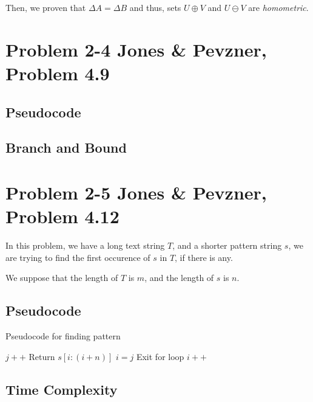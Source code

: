 \documentclass{article}
\begin{document}
Then, we proven that $\Delta A = \Delta B$ and thus, sets $U\oplus V$ and $U \ominus V$ are \textit{homometric}.

\section*{Problem 2-4 Jones \& Pevzner, Problem 4.9}

\subsection*{Pseudocode}

\subsection*{Branch and Bound}

\section*{Problem 2-5 Jones \& Pevzner, Problem 4.12}

In this problem, we have a long text string $T$, and a shorter pattern string $s$, we are trying to find the first occurence of $s$ in $T$, if there is any.

We suppose that the length of $T$ is $m$, and the length of $s$ is $n$.

\subsection*{Pseudocode}

\begin{algorithm}[H]
\caption{Pseudocode for finding pattern}
\begin{algorithmic}
       \State $j++$
      \EndIf
       \State Return $s[i:(i+n)]$
      \EndIf
     \EndIf
      \State $i = j$
      \State Exit for loop
     \EndIf
    \EndFor
  \EndIf
   \State $i++$
  \EndIf
 \EndWhile
\EndFunction
\end{algorithmic}
\end{algorithm}

\subsection*{Time Complexity}
\end{document}
